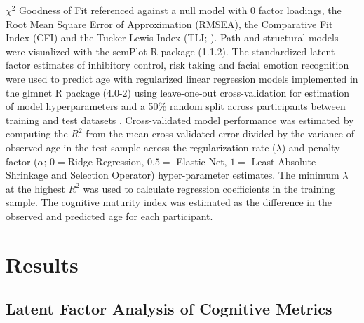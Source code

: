 \documentclass{article}%
\begin{document}
$\chi^2$ Goodness of Fit referenced against a null model with $0$ factor loadings, the Root Mean Square Error of Approximation (RMSEA), the Comparative Fit Index (CFI) and the Tucker-Lewis Index (TLI; \cite{KennyEtAl2015,HuTzeBentler1999, wu2009evaluating}). Path and structural models were visualized with the semPlot R package (1.1.2). The standardized latent factor estimates of inhibitory control, risk taking and facial emotion recognition were used to predict age with regularized linear regression models implemented in the glmnet R package (4.0-2) using leave-one-out cross-validation for estimation of model hyperparameters and a 50\% random split across participants between training and test datasets \citep{FriedmanHastieTibshirani2010, friedman2009glmnet}. Cross-validated model performance was estimated by computing the $R^2$ from the mean cross-validated error divided by the variance of observed age in the test sample across the regularization rate ($\lambda$) and penalty factor ($\alpha$; $0 = $Ridge Regression, $0.5 = $ Elastic Net, $1 =$ Least Absolute Shrinkage and Selection Operator) hyper-parameter estimates. The minimum $\lambda$ at the highest $R^2$ was used to calculate regression coefficients in the training sample. The cognitive maturity index was estimated as the difference in the observed and predicted age for each participant. 
\section*{Results} 
\subsection*{Latent Factor Analysis of Cognitive Metrics} 
\end{document}
